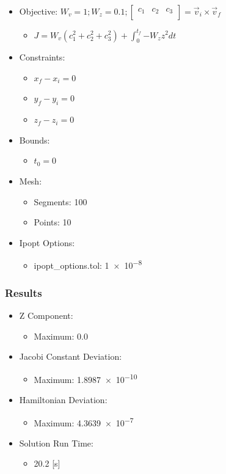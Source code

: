 \documentclass{article}
\begin{document}
\begin{itemize}
    \item Objective: $W_v = 1; W_z = 0.1; \left[\begin{matrix}c_1&c_2&c_3\\\end{matrix}\right] = \vec{v}_i\times\vec{v}_f$
    \begin{itemize}
        \item $J = W_v\left(c_1^2 + c_2^2 + c_3^2\right) + \int_{0}^{t_f}{-W_zz^2dt}$
    \end{itemize}
    \item Constraints:
    \begin{itemize}
        \item $x_f - x_i = 0$
        \item $y_f - y_i = 0$
        \item $z_f - z_i = 0$
    \end{itemize}
    \item Bounds:
    \begin{itemize}
        \item $t_0 = 0$
    \end{itemize}
    \item Mesh:
    \begin{itemize}
        \item Segments: 100
        \item Points: 10
    \end{itemize}
    \item Ipopt Options:
    \begin{itemize}
        \item ipopt\_options.tol: \num{1e-8}
    \end{itemize}
\end{itemize}

\subsubsection{Results}

\begin{itemize}
    \item Z Component:
    \begin{itemize}
        \item Maximum: 0.0
    \end{itemize}
    \item Jacobi Constant Deviation:
    \begin{itemize}
        \item Maximum: \num{1.8987e-10}
    \end{itemize}
    \item Hamiltonian Deviation:
    \begin{itemize}
        \item Maximum: \num{4.3639e-7}
    \end{itemize}
    \item Solution Run Time:
    \begin{itemize}
        \item 20.2 [s]
    \end{itemize}  
\end{itemize}
\end{document}
